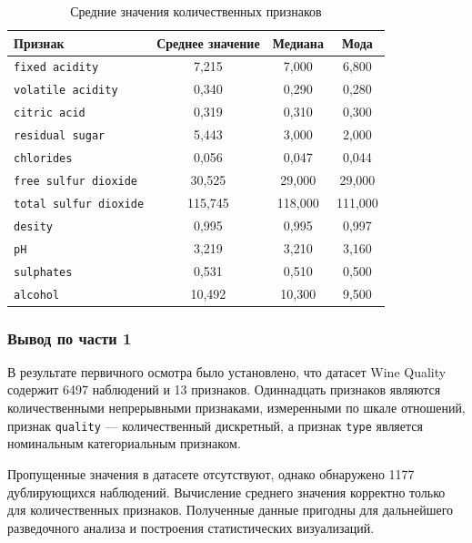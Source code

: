 \begin{table}[ht]
    \centering
    \caption{Средние значения количественных признаков}
    \label{tab:means-wine}
    \begin{tabularx}{0.65\textwidth}{LCCC}
        \hline
        Признак & Среднее значение & Медиана & Мода \\
        \hline
        \texttt{fixed acidity} & 7{,}215 & 7{,}000 & 6{,}800\\
        \texttt{volatile acidity}  & 0{,}340 & 0{,}290 & 0{,}280\\
        \texttt{citric acid} & 0{,}319 & 0{,}310 & 0{,}300\\
        \texttt{residual sugar}  & 5{,}443 & 3{,}000 & 2{,}000\\
        \texttt{chlorides}  & 0{,}056 & 0{,}047 & 0{,}044\\
        \texttt{free sulfur dioxide}  & 30{,}525 & 29{,}000 & 29{,}000\\
        \texttt{total sulfur dioxide}  & 115{,}745 & 118{,}000 & 111{,}000\\
        \texttt{desity}  & 0{,}995 & 0{,}995 & 0{,}997\\
        \texttt{pH}  & 3{,}219 & 3{,}210 & 3{,}160\\
        \texttt{sulphates}  & 0{,}531 & 0{,}510 & 0{,}500\\
        \texttt{alcohol}  & 10{,}492 & 10{,}300 & 9{,}500\\
        \hline
    \end{tabularx}
\end{table}
 
\subsubsection*{Вывод по части 1}
 
В результате первичного осмотра было установлено, что датасет Wine Quality содержит 6497 наблюдений и 13 признаков. Одиннадцать признаков являются количественными непрерывными признаками, измеренными по шкале отношений, признак \texttt{quality} --- количественный дискретный, а признак \texttt{type} является номинальным категориальным признаком.

Пропущенные значения в датасете отсутствуют, однако обнаружено 1177 дублирующихся наблюдений. Вычисление среднего значения корректно только для количественных признаков. Полученные данные пригодны для дальнейшего разведочного анализа и построения статистических визуализаций.
 

